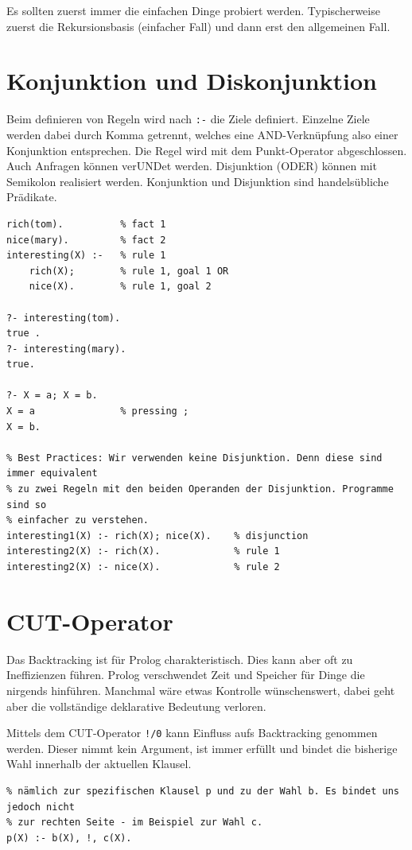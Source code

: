 Es sollten zuerst immer die einfachen Dinge probiert werden. Typischerweise zuerst die Rekursionsbasis (einfacher Fall) und dann erst den allgemeinen Fall. 

\newpage

\section{Konjunktion und Diskonjunktion}
Beim definieren von Regeln wird nach \verb|:-| die Ziele definiert. Einzelne Ziele werden dabei durch Komma getrennt, welches eine AND-Verknüpfung also einer Konjunktion entsprechen. Die Regel wird mit dem Punkt-Operator abgeschlossen. Auch Anfragen können verUNDet werden. Disjunktion (ODER) können mit Semikolon realisiert werden. Konjunktion und Disjunktion sind handelsübliche Prädikate. 

\begin{lstlisting}[caption=Disjunktion]
rich(tom). 			% fact 1
nice(mary). 		% fact 2
interesting(X) :- 	% rule 1
	rich(X); 		% rule 1, goal 1 OR
	nice(X).		% rule 1, goal 2

?- interesting(tom).
true .
?- interesting(mary).
true.

?- X = a; X = b.
X = a 				% pressing ;
X = b.

% Best Practices: Wir verwenden keine Disjunktion. Denn diese sind immer equivalent 
% zu zwei Regeln mit den beiden Operanden der Disjunktion. Programme sind so 
% einfacher zu verstehen.
interesting1(X) :- rich(X); nice(X). 	% disjunction
interesting2(X) :- rich(X). 			% rule 1
interesting2(X) :- nice(X). 			% rule 2
\end{lstlisting}

\newpage

\section{CUT-Operator}

Das Backtracking ist für Prolog charakteristisch. Dies kann aber oft zu Ineffizienzen führen. Prolog verschwendet Zeit und Speicher für Dinge die nirgends hinführen. Manchmal wäre etwas Kontrolle wünschenswert, dabei geht aber die vollständige deklarative Bedeutung verloren.

Mittels dem CUT-Operator \verb|!/0| kann Einfluss aufs Backtracking genommen werden. Dieser nimmt kein Argument, ist immer erfüllt und bindet die bisherige Wahl innerhalb der aktuellen Klausel.

\begin{lstlisting}[caption=Beispiel CUT-Operator]
% Wenn in folgender Regel der CUT erreicht wird. Bindet uns das zur linken Seite, 
% nämlich zur spezifischen Klausel p und zu der Wahl b. Es bindet uns jedoch nicht 
% zur rechten Seite - im Beispiel zur Wahl c.
p(X) :- b(X), !, c(X).
\end{lstlisting}

